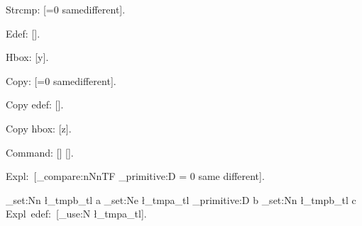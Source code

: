 \documentclass{article}
\begin{document}
Strcmp: [\ifnum\pdfprimitive{}=0 same\else different\fi].

Edef: \def\x{a}\edef\cmp{\pdfprimitive\pdfstrcmp{\x}{b}}\def\x{c}[\cmp].

Hbox: [\pdfprimitive\hbox{y}].

\makeatletter
Copy: [\ifnum\pdf@primitive{}=0 same\else different\fi].

Copy edef: \def\x{b}\edef\cmp{\pdf@primitive\pdfstrcmp{\x}{a}}\def\x{0}[\cmp].

Copy hbox: [\pdf@primitive\hbox{z}].

Command: [] [].
\makeatother

\ExplSyntaxOn
Expl:~[\int_compare:nNnTF { \tex_primitive:D  } = 0 {same} {different}].

\tl_set:Nn \l_tmpb_tl {a}
\tl_set:Ne \l_tmpa_tl { \tex_primitive:D  {b} }
\tl_set:Nn \l_tmpb_tl {c}
Expl~edef:~[\tl_use:N \l_tmpa_tl].
\ExplSyntaxOff
\end{document}
